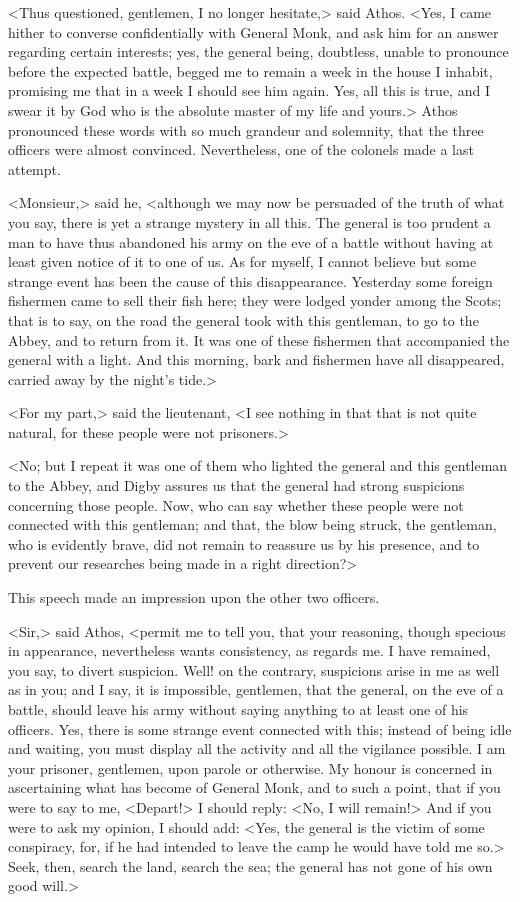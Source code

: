 <Thus questioned, gentlemen, I no longer hesitate,> said Athos. <Yes, I came hither to converse confidentially with General Monk, and ask him for an answer regarding certain interests; yes, the general being, doubtless, unable to pronounce before the expected battle, begged me to remain a week in the house I inhabit, promising me that in a week I should see him again. Yes, all this is true, and I swear it by God who is the absolute master of my life and yours.> Athos pronounced these words with so much grandeur and solemnity, that the three officers were almost convinced. Nevertheless, one of the colonels made a last attempt.

<Monsieur,> said he, <although we may now be persuaded of the truth of what you say, there is yet a strange mystery in all this. The general is too prudent a man to have thus abandoned his army on the eve of a battle without having at least given notice of it to one of us. As for myself, I cannot believe but some strange event has been the cause of this disappearance. Yesterday some foreign fishermen came to sell their fish here; they were lodged yonder among the Scots; that is to say, on the road the general took with this gentleman, to go to the Abbey, and to return from it. It was one of these fishermen that accompanied the general with a light. And this morning, bark and fishermen have all disappeared, carried away by the night's tide.>

<For my part,> said the lieutenant, <I see nothing in that that is not quite natural, for these people were not prisoners.>

<No; but I repeat it was one of them who lighted the general and this gentleman to the Abbey, and Digby assures us that the general had strong suspicions concerning those people. Now, who can say whether these people were not connected with this gentleman; and that, the blow being struck, the gentleman, who is evidently brave, did not remain to reassure us by his presence, and to prevent our researches being made in a right direction?>

This speech made an impression upon the other two officers.

<Sir,> said Athos, <permit me to tell you, that your reasoning, though specious in appearance, nevertheless wants consistency, as regards me. I have remained, you say, to divert suspicion. Well! on the contrary, suspicions arise in me as well as in you; and I say, it is impossible, gentlemen, that the general, on the eve of a battle, should leave his army without saying anything to at least one of his officers. Yes, there is some strange event connected with this; instead of being idle and waiting, you must display all the activity and all the vigilance possible. I am your prisoner, gentlemen, upon parole or otherwise. My honour is concerned in ascertaining what has become of General Monk, and to such a point, that if you were to say to me, <Depart!> I should reply: <No, I will remain!> And if you were to ask my opinion, I should add: <Yes, the general is the victim of some conspiracy, for, if he had intended to leave the camp he would have told me so.> Seek, then, search the land, search the sea; the general has not gone of his own good will.>

